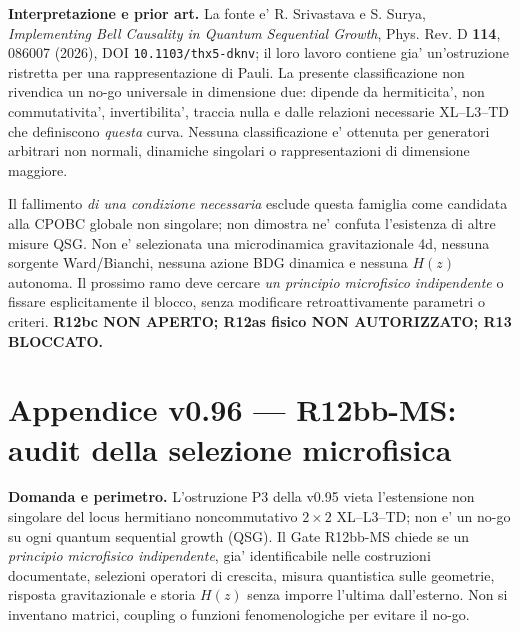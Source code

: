\documentclass[11pt,a4paper]{article}
\begin{document}
\textbf{Interpretazione e prior art.} La fonte e' R. Srivastava e S. Surya, \emph{Implementing Bell Causality in Quantum Sequential Growth}, Phys. Rev. D \textbf{114}, 086007 (2026), DOI \texttt{10.1103/thx5-dknv}; il loro lavoro contiene gia' un'ostruzione ristretta per una rappresentazione di Pauli. La presente classificazione non rivendica un no-go universale in dimensione due: dipende da hermiticita', non commutativita', invertibilita', traccia nulla e dalle relazioni necessarie XL--L3--TD che definiscono \emph{questa} curva. Nessuna classificazione e' ottenuta per generatori arbitrari non normali, dinamiche singolari o rappresentazioni di dimensione maggiore.

Il fallimento \emph{di una condizione necessaria} esclude questa famiglia come candidata alla CPOBC globale non singolare; non dimostra ne' confuta l'esistenza di altre misure QSG. Non e' selezionata una microdinamica gravitazionale 4d, nessuna sorgente Ward/Bianchi, nessuna azione BDG dinamica e nessuna $H(z)$ autonoma. Il prossimo ramo deve cercare \emph{un principio microfisico indipendente} o fissare esplicitamente il blocco, senza modificare retroattivamente parametri o criteri. \textbf{R12bc NON APERTO; R12as fisico NON AUTORIZZATO; R13 BLOCCATO.}
\endgroup
\clearpage
\begingroup
\setlength{\parskip}{0.18em}
\section*{Appendice v0.96 --- R12bb-MS: audit della selezione microfisica}
\textbf{Domanda e perimetro.} L'ostruzione P3 della v0.95 vieta l'estensione non singolare del locus hermitiano noncommutativo $2\times2$ XL--L3--TD; non e' un no-go su ogni quantum sequential growth (QSG). Il Gate R12bb-MS chiede se un \emph{principio microfisico indipendente}, gia' identificabile nelle costruzioni documentate, selezioni operatori di crescita, misura quantistica sulle geometrie, risposta gravitazionale e storia $H(z)$ senza imporre l'ultima dall'esterno. Non si inventano matrici, coupling o funzioni fenomenologiche per evitare il no-go.
\end{document}

